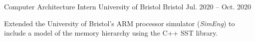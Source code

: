 \begin{cventries}
  \cventry
    {Computer Architecture Intern} %
    {University of Bristol} %
    {Bristol} %
    {Jul. 2020 -- Oct. 2020} %
    {
      \begin{cvitems} %
        \item {Extended the University of Bristol's ARM processor simulator (\textit{SimEng}) to include a model of the memory hierarchy using the C++ SST library.}
      \end{cvitems}
    }

  \vspace{-0.2em}
  


\end{cventries}
